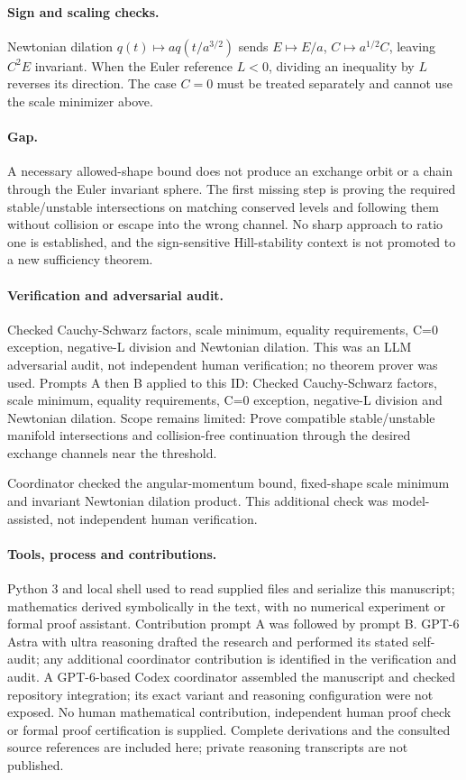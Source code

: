 \documentclass[11pt]{article}
\begin{document}
\paragraph{Sign and scaling checks.}Newtonian dilation \(q(t)\mapsto a q(t/a^{3/2})\) sends \(E\mapsto E/a\), \(C\mapsto a^{1/2}C\), leaving \(C^2E\) invariant. When the Euler reference \(L<0\), dividing an inequality by \(L\) reverses its direction. The case \(C=0\) must be treated separately and cannot use the scale minimizer above.
\paragraph{Gap.}A necessary allowed-shape bound does not produce an exchange orbit or a chain through the Euler invariant sphere. The first missing step is proving the required stable/unstable intersections on matching conserved levels and following them without collision or escape into the wrong channel. No sharp approach to ratio one is established, and the sign-sensitive Hill-stability context is not promoted to a new sufficiency theorem.

\paragraph{Verification and adversarial audit.}
Checked Cauchy-Schwarz factors, scale minimum, equality requirements, C=0 exception, negative-L division and Newtonian dilation. This was an LLM adversarial audit, not independent human verification; no theorem prover was used. Prompts A then B applied to this ID: Checked Cauchy-Schwarz factors, scale minimum, equality requirements, C=0 exception, negative-L division and Newtonian dilation. Scope remains limited: Prove compatible stable/unstable manifold intersections and collision-free continuation through the desired exchange channels near the threshold.

Coordinator checked the angular-momentum bound, fixed-shape scale minimum and invariant Newtonian dilation product. This additional check was model-assisted, not independent human verification.

\paragraph{Tools, process and contributions.}
Python 3 and local shell used to read supplied files and serialize this manuscript; mathematics derived symbolically in the text, with no numerical experiment or formal proof assistant. Contribution prompt A was followed by prompt B. GPT-6 Astra with ultra reasoning drafted the research and performed its stated self-audit; any additional coordinator contribution is identified in the verification and audit. A GPT-6-based Codex coordinator assembled the manuscript and checked repository integration; its exact variant and reasoning configuration were not exposed. No human mathematical contribution, independent human proof check or formal proof certification is supplied. Complete derivations and the consulted source references are included here; private reasoning transcripts are not published.
\end{document}
